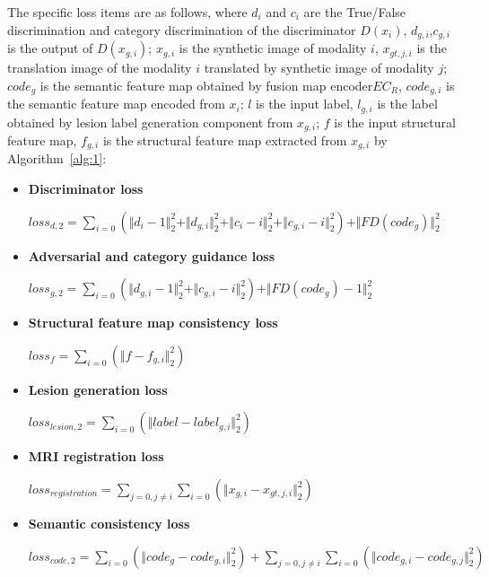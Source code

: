 \documentclass[letterpaper]{article} %
\begin{document}
The specific loss items are as follows, where $d_{i}$ and $c_{i}$ are the True/False discrimination and category discrimination of the discriminator $D(x_i)$, $d_{g, i}$,$c_{g,i}$ is the output of $D(x_{g,i})$; $x_{g,i}$ is the synthetic image of modality $i$, $x_{gt,j,i}$ is the translation image of the modality $i$ translated by synthetic image of modality $j$; $code_g$ is the semantic feature map obtained by fusion map encoder$EC_R$, $code_{g,i}$ is the semantic feature map encoded from $x_i$; $l$ is the input label, $l_{g,i}$ is the label obtained by lesion label generation component from $x_{g,i}$; $f$ is the input structural feature map, $f_{g,i}$ is the structural feature map extracted from $x_{g,i}$ by Algorithm~\ref{alg:1}:
\begin{itemize}
	\item \textbf{Discriminator loss }
	\begin{center}
		$loss_{d,2}=\sum\limits_{i=0}(\Vert{d_{i}-1}\Vert_{2}^{2}+\Vert{d_{g,i}}\Vert_{2}^{2}+\Vert{c_{i}-i}\Vert_{2}^{2}+\Vert{c_{g,i}-i}\Vert_{2}^{2})+\Vert{FD(code_{g})}\Vert_{2}^{2}$
	\end{center}

	\item \textbf{Adversarial and category guidance loss}
	\begin{center}
		$loss_{g,2}=\sum\limits_{i=0}(\Vert{d_{g,i}-1}\Vert_{2}^{2}+\Vert{c_{g,i}-i}\Vert_{2}^{2})+\Vert{FD(code_{g})-1}\Vert_{2}^{2}$
	\end{center}
	
	\item \textbf{Structural feature map consistency loss}
	\begin{center}
		$loss_{f}=\sum\limits_{i=0}(\Vert{f-f_{g,i}}\Vert_{2}^{2})$
	\end{center}
	
	\item \textbf{Lesion generation loss}
	\begin{center}
		$loss_{lesion,2}=\sum\limits_{i=0}(\Vert{label-label_{g,i}}\Vert_{2}^{2})$
	\end{center}
	
	\item \textbf{MRI registration loss}
	\begin{center}
		$loss_{registration}=\sum\limits_{j=0,j\neq i}\sum\limits_{i=0}(\Vert{x_{g,i}-x_{gt,j,i}}\Vert_{2}^{2})$
	\end{center}
	
	\item \textbf{Semantic consistency loss}
	\begin{center}
		$loss_{code,2}=\sum\limits_{i=0}(\Vert{code_g-code_{g,i}}\Vert_{2}^{2})+\sum\limits_{j=0,j\neq i}\sum\limits_{i=0}(\Vert{code_{g,i}-code_{g,j}}\Vert_{2}^{2})$
	\end{center}
	
\end{itemize}
\end{document}
